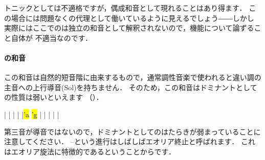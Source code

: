 \documentclass[dvipdfmx,uplatex,b5paper,openany,jbase=12Q,nomag*,textwidth-limit=44%
               ]{gachimuchi}
\begin{document}
トニックとしては不適格ですが，偶成和音として現れることはあり得ます．
この場合には問題なくの代理として働いているように見えるでしょう――しかし
実際にはここでの\bFlat\Gniii\Aug は独立の和音として解釈されないので，機能について論ずること自体が
不適当なのです．


\paragraph{\Gnv\Min の和音}
この和音は自然的短音階に由来するもので，通常調性音楽で使われる\Gnv と違い調の主音への上行導音(Sol\aSharp)を持ちません．
そのため，この和音はドミナントとしての性質は弱いといえます
（）．

\begin{floatMusic}[pos=ht]
  \Startpiece%
  \znotes|\en
  \NOTes
  |%
  \en\bar
  \NOTEs
  |%
  \en\doublebar
  \NOTes
  |\hl{'a}%
  \hl{'g}%
  \en\bar
  \NOTEs
  |%
  \en\doublebar
  \NOTes
  |%
  \en\bar
  \NOTEs
  |
  \en\setdoublebar
  \endpiece%
\end{floatMusic}

第三音が導音ではないので，ドミナントとしてのはたらきが弱まっていることに注意してください．
--という進行はしばしばエオリア終止と呼ばれます．
これはエオリア旋法に特徴的であるということからです．
\end{document}
